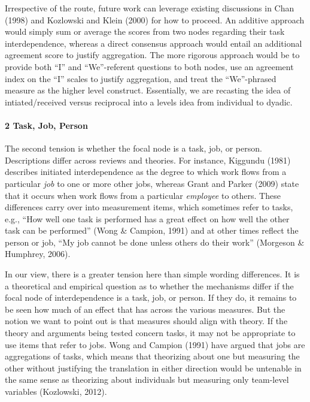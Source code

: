 \documentclass[english,,man]{apa6}
\let\oldparagraph\paragraph
\renewcommand{\paragraph}[1]{\oldparagraph{#1}\mbox{}}
\theoremstyle{definition}
\theoremstyle{definition}
\theoremstyle{definition}
\theoremstyle{remark}
\begin{document}
Irrespective of the route, future work can leverage existing discussions
in Chan (1998) and Kozlowski and Klein (2000) for how to proceed. An
additive approach would simply sum or average the scores from two nodes
regarding their task interdependence, whereas a direct consensus
approach would entail an additional agreement score to justify
aggregation. The more rigorous approach would be to provide both
\enquote{I} and \enquote{We}-referent questions to both nodes, use an
agreement index on the \enquote{I} scales to justify aggregation, and
treat the \enquote{We}-phrased measure as the higher level construct.
Essentially, we are recasting the idea of intiated/received versus
reciprocal into a levels idea from individual to dyadic.

\hypertarget{task-job-person}{%
\paragraph{2 Task, Job, Person}\label{task-job-person}}

The second tension is whether the focal node is a task, job, or person.
Descriptions differ across reviews and theories. For instance, Kiggundu
(1981) describes initiated interdependence as the degree to which work
flows from a particular \emph{job} to one or more other jobs, whereas
Grant and Parker (2009) state that it occurs when work flows from a
particular \emph{employee} to others. These differences carry over into
measurement items, which sometimes refer to tasks, e.g., \enquote{How
well one task is performed has a great effect on how well the other task
can be performed} (Wong \& Campion, 1991) and at other times reflect the
person or job, \enquote{My job cannot be done unless others do their
work} (Morgeson \& Humphrey, 2006).

In our view, there is a greater tension here than simple wording
differences. It is a theoretical and empirical question as to whether
the mechanisms differ if the focal node of interdependence is a task,
job, or person. If they do, it remains to be seen how much of an effect
that has across the various measures. But the notion we want to point
out is that measures should align with theory. If the theory and
arguments being tested concern tasks, it may not be appropriate to use
items that refer to jobs. Wong and Campion (1991) have argued that jobs
are aggregations of tasks, which means that theorizing about one but
measuring the other without justifying the translation in either
direction would be untenable in the same sense as theorizing about
individuals but measuring only team-level variables (Kozlowski, 2012).
\end{document}
